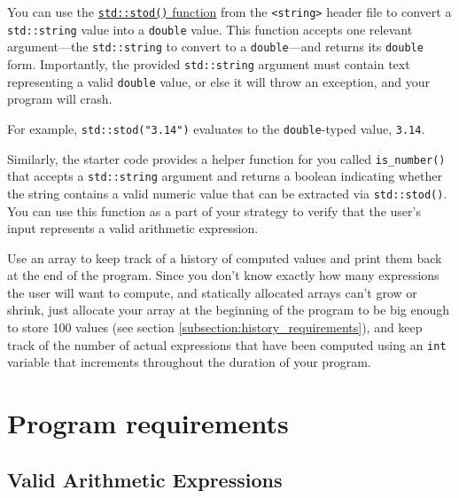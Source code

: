 \documentclass{article}
\newenvironment{hint}
    {\begin{tcolorbox}[title=Hint,colframe=white!70!blue,colback=white]}
    {\end{tcolorbox}}
\begin{document}
\begin{hint}
    You can use the \href{https://en.cppreference.com/w/cpp/string/basic_string/stof}{\texttt{std::stod()} function} from the \texttt{<string>} header file to convert a \texttt{std::string} value into a \texttt{double} value. This function accepts one relevant argument---the \texttt{std::string} to convert to a \texttt{double}---and returns its \texttt{double} form. Importantly, the provided \texttt{std::string} argument must contain text representing a valid \texttt{double} value, or else it will throw an exception, and your program will crash.
    
    \vspace{6pt}
    
    For example, \texttt{std::stod("3.14")} evaluates to the \texttt{double}-typed value, \texttt{3.14}.

    \vspace{6pt}

    Similarly, the starter code provides a helper function for you called \texttt{is\_number()} that accepts a \texttt{std::string} argument and returns a boolean indicating whether the string contains a valid numeric value that can be extracted via \texttt{std::stod()}. You can use this function as a part of your strategy to verify that the user's input represents a valid arithmetic expression.
\end{hint}

\begin{hint}
    Use an array to keep track of a history of computed values and print them back at the end of the program. Since you don't know exactly how many expressions the user will want to compute, and statically allocated arrays can't grow or shrink, just allocate your array at the beginning of the program to be big enough to store 100 values (see section \ref{subsection:history_requirements}), and keep track of the number of actual expressions that have been computed using an \texttt{int} variable that increments throughout the duration of your program.
\end{hint}

\section{Program requirements}

\subsection{Valid Arithmetic Expressions}
\label{subsection:valid_arithmetic_expressions}
\end{document}
